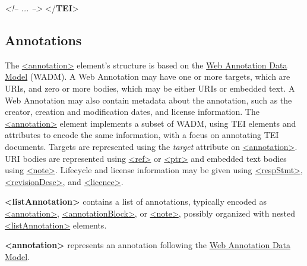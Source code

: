 \begin{shaded}
\textit{<!-- ... -->}\mbox{}\newline 
\hspace*{1em}\hspace*{1em}\mbox{}\newline 
\hspace*{1em}\mbox{}\newline 
{}\mbox{}\newline 
{</\textbf{TEI}>}\end{shaded}\egroup\par 
\subsection[{Annotations}]{Annotations}\label{SASOann}\par
The \hyperref[TEI.annotation]{<annotation>} element's structure is based on the \hyperref[WADM]{Web Annotation Data Model} (WADM). A Web Annotation may have one or more targets, which are URIs, and zero or more bodies, which may be either URIs or embedded text. A Web Annotation may also contain metadata about the annotation, such as the creator, creation and modification dates, and license information. The \hyperref[TEI.annotation]{<annotation>} element implements a subset of WADM, using TEI elements and attributes to encode the same information, with a focus on annotating TEI documents. Targets are represented using the {\itshape target} attribute on \hyperref[TEI.annotation]{<annotation>}. URI bodies are represented using \hyperref[TEI.ref]{<ref>} or \hyperref[TEI.ptr]{<ptr>} and embedded text bodies using \hyperref[TEI.note]{<note>}. Lifecycle and license information may be given using \hyperref[TEI.respStmt]{<respStmt>}, \hyperref[TEI.revisionDesc]{<revisionDesc>}, and \hyperref[TEI.licence]{<licence>}. 
\begin{sansreflist}
  
\item [\textbf{<listAnnotation>}] contains a list of annotations, typically encoded as \hyperref[TEI.annotation]{<annotation>}, \hyperref[TEI.annotationBlock]{<annotationBlock>}, or \hyperref[TEI.note]{<note>}, possibly organized with nested \hyperref[TEI.listAnnotation]{<listAnnotation>} elements.
\item [\textbf{<annotation>}] represents an annotation following the \hyperref[WADM]{Web Annotation Data Model}.
\end{sansreflist}
